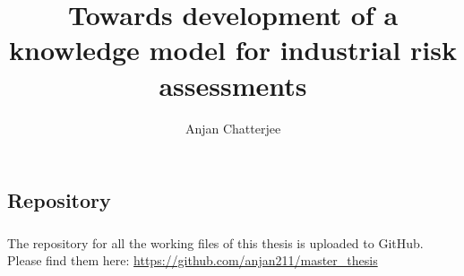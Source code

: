 \documentclass[
		master, %
		theotuv, %
		nomencl, %
		hyperref,
		nolof,
		nolot,
		nolst,
		bibnum
	]{mrcc}
\author{Anjan Chatterjee}
\title{Towards development of a knowledge model for industrial risk assessments}
\begin{document}
        \listoffigures
	
	
	
	
	
	
	
	
        
	\begin{appendix}
		\chapter{Repository}
        \paragraph{} \bigskip\bigskip\bigskip\bigskip\bigskip The repository for all the working files of this thesis is uploaded to GitHub. Please find them here: \url{https://github.com/anjan211/master_thesis}
	\end{appendix}
\end{document}
